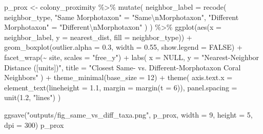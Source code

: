 \documentclass[
  letterpaper,
  DIV=11,
  numbers=noendperiod]{scrartcl}
\newenvironment{Shaded}{\begin{snugshade}}{\end{snugshade}}
\newcommand{\AttributeTok}[1]{\textcolor[rgb]{0.40,0.45,0.13}{#1}}
\newcommand{\ConstantTok}[1]{\textcolor[rgb]{0.56,0.35,0.01}{#1}}
\newcommand{\DecValTok}[1]{\textcolor[rgb]{0.68,0.00,0.00}{#1}}
\newcommand{\FloatTok}[1]{\textcolor[rgb]{0.68,0.00,0.00}{#1}}
\newcommand{\FunctionTok}[1]{\textcolor[rgb]{0.28,0.35,0.67}{#1}}
\newcommand{\NormalTok}[1]{\textcolor[rgb]{0.00,0.23,0.31}{#1}}
\newcommand{\OtherTok}[1]{\textcolor[rgb]{0.00,0.23,0.31}{#1}}
\newcommand{\SpecialCharTok}[1]{\textcolor[rgb]{0.37,0.37,0.37}{#1}}
\newcommand{\StringTok}[1]{\textcolor[rgb]{0.13,0.47,0.30}{#1}}
\begin{document}
\begin{Shaded}
\begin{Highlighting}[]
\NormalTok{p\_prox }\OtherTok{\textless{}{-}}\NormalTok{ colony\_proximity }\SpecialCharTok{\%\textgreater{}\%}
  \FunctionTok{mutate}\NormalTok{(}
    \AttributeTok{neighbor\_label =} \FunctionTok{recode}\NormalTok{(}
\NormalTok{      neighbor\_type,}
      \StringTok{"Same Morphotaxon"} \OtherTok{=} \StringTok{"Same}\SpecialCharTok{\textbackslash{}n}\StringTok{Morphotaxon"}\NormalTok{,}
      \StringTok{"Different Morphotaxon"} \OtherTok{=} \StringTok{"Different}\SpecialCharTok{\textbackslash{}n}\StringTok{Morphotaxon"}
\NormalTok{    )}
\NormalTok{  ) }\SpecialCharTok{\%\textgreater{}\%}
  \FunctionTok{ggplot}\NormalTok{(}\FunctionTok{aes}\NormalTok{(}\AttributeTok{x =}\NormalTok{ neighbor\_label, }\AttributeTok{y =}\NormalTok{ nearest\_dist, }\AttributeTok{fill =}\NormalTok{ neighbor\_type)) }\SpecialCharTok{+}
  \FunctionTok{geom\_boxplot}\NormalTok{(}\AttributeTok{outlier.alpha =} \FloatTok{0.3}\NormalTok{, }\AttributeTok{width =} \FloatTok{0.55}\NormalTok{, }\AttributeTok{show.legend =} \ConstantTok{FALSE}\NormalTok{) }\SpecialCharTok{+}
  \FunctionTok{facet\_wrap}\NormalTok{(}\SpecialCharTok{\textasciitilde{}}\NormalTok{ site, }\AttributeTok{scales =} \StringTok{"free\_y"}\NormalTok{) }\SpecialCharTok{+}
  \FunctionTok{labs}\NormalTok{(}
    \AttributeTok{x =} \ConstantTok{NULL}\NormalTok{,}
    \AttributeTok{y =} \StringTok{"Nearest{-}Neighbor Distance ([units])"}\NormalTok{,}
    \AttributeTok{title =} \StringTok{"Closest Same{-} vs. Different{-}Morphotaxon Coral Neighbors"}
\NormalTok{  ) }\SpecialCharTok{+}
  \FunctionTok{theme\_minimal}\NormalTok{(}\AttributeTok{base\_size =} \DecValTok{12}\NormalTok{) }\SpecialCharTok{+}
  \FunctionTok{theme}\NormalTok{(}
    \AttributeTok{axis.text.x =} \FunctionTok{element\_text}\NormalTok{(}\AttributeTok{lineheight =} \FloatTok{1.1}\NormalTok{, }\AttributeTok{margin =} \FunctionTok{margin}\NormalTok{(}\AttributeTok{t =} \DecValTok{6}\NormalTok{)),}
    \AttributeTok{panel.spacing =} \FunctionTok{unit}\NormalTok{(}\FloatTok{1.2}\NormalTok{, }\StringTok{"lines"}\NormalTok{)}
\NormalTok{  )}

\FunctionTok{ggsave}\NormalTok{(}\StringTok{"outputs/fig\_same\_vs\_diff\_taxa.png"}\NormalTok{, p\_prox, }\AttributeTok{width =} \DecValTok{9}\NormalTok{, }\AttributeTok{height =} \DecValTok{5}\NormalTok{, }\AttributeTok{dpi =} \DecValTok{300}\NormalTok{)}
\NormalTok{p\_prox}
\end{Highlighting}
\end{Shaded}
\end{document}
